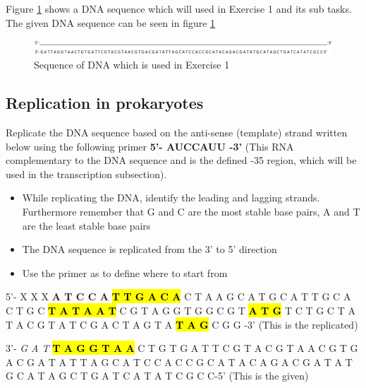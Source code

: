 Figure \ref*{fig:Exercise1Seq} shows a DNA sequence which will used in Exercise 1 and its sub tasks. The given DNA sequence can be seen in figure \ref{fig:Exercise1Seq}

\begin{figure}[h]
    \centering  
    \includegraphics[width=1\textwidth]{Figures/Exercise1Seq.png}
    \caption{Sequence of DNA which is used in Exercise 1}
    \label{fig:Exercise1Seq}
\end{figure}
\subsection{Replication in prokaryotes}
Replicate the DNA sequence based on the anti-sense (template) strand written below using the following primer \textbf{5’- AUCCAUU -3’} (This RNA complementary to the DNA sequence and is the defined -35 region, which will be used in the transcription subsection).

\vspace{1em}
\begin{itemize}
    \item While replicating the DNA, identify the leading and lagging strands. Furthermore remember that G and C are the most stable base pairs, A and T are the least stable base pairs
    \item The DNA sequence is replicated from the 3’ to 5’ direction
    \item Use the primer as to define where to start from
\end{itemize} 

\vspace{1em}

5'- X X X \textbf{A T C C A} \textbf{\hl{T T G A C A}} C T A A G C A T G C A T T G C A C T G C \hl{\textbf{T A T A A T}} C G T A G G T G G C G T \textbf{\hl{A T G}} T C T G C T A T A C G T A T C G A C T A G T A \textbf{\hl{T A G}} C G G -3'      (This is the replicated)

\vspace{1em}

3’- \textit{G A T} \hl{\textbf{T A G G T A A}} C T G T G A T T C G T A C G T A A C G T G A C G A T A T T A G C A T C C A C C G C A T A C A G A C G A T A T G C A T A G C T G A T C A T A T C G C C-5’      (This is the given)

